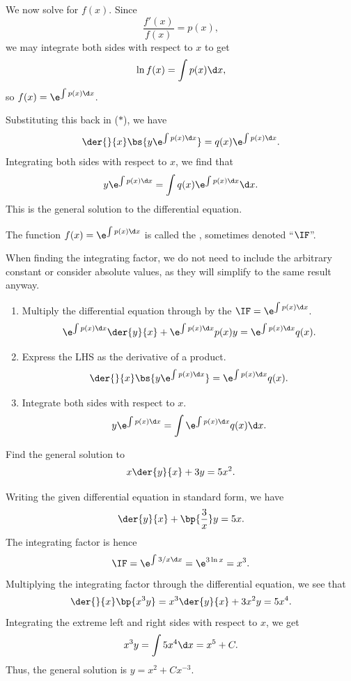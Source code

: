We now solve for $f(x)$. Since \[\frac{f'(x)}{f(x)} = p(x),\] we may integrate both sides with respect to $x$ to get \[\ln f(x) = \int p(x) \d x,\] so $f(x) = \e^{\int p(x) \d x}$.

Substituting this back in ($\ast$), we have \[\der{}{x} \bs{y \e^{\int p(x) \d x}} = q(x) \e^{\int p(x) \d x}.\] Integrating both sides with respect to $x$, we find that \[y \e^{\int p(x) \d x} = \int q(x) \e^{\int p(x) \d x} \d x.\] This is the general solution to the differential equation.

\begin{definition}
    The function $f(x) = \e^{\int p(x) \d x}$ is called the , sometimes denoted ``$\IF$''.
\end{definition}

When finding the integrating factor, we do not need to include the arbitrary constant or consider absolute values, as they will simplify to the same result anyway.

\begin{recipe}
    \phantom{.}
    \begin{enumerate}
        \item Multiply the differential equation through by the $\IF = \e^{\int p(x) \d x}$. \[\e^{\int p(x) \d x} \der{y}{x} + \e^{\int p(x) \d x} p(x) y = \e^{\int p(x) \d x} q(x).\]
        \item Express the LHS as the derivative of a product. \[\der{}{x} \bs{y \e^{\int p(x) \d x}} = \e^{\int p(x) \d x} q(x).\]
        \item Integrate both sides with respect to $x$. \[y \e^{\int p(x) \d x} = \int \e^{\int p(x) \d x} q(x) \d x.\]
    \end{enumerate}
\end{recipe}

\begin{sample}
    Find the general solution to \[x \der{y}{x} + 3y = 5x^2.\]
\end{sample}
\begin{sampans}
    Writing the given differential equation in standard form, we have \[\der{y}{x} + \bp{\frac3x}y = 5x.\] The integrating factor is hence \[\IF = \e^{\int 3/x \d x} = \e^{3\ln x} = x^3.\] Multiplying the integrating factor through the differential equation, we see that \[\der{}{x} \bp{x^3 y} = x^3 \der{y}{x} + 3x^2 y = 5x^4.\] Integrating the extreme left and right sides with respect to $x$, we get\[x^3 y = \int 5x^4 \d x = x^5 + C.\] Thus, the general solution is $y = x^2 + Cx^{-3}$.
\end{sampans}

